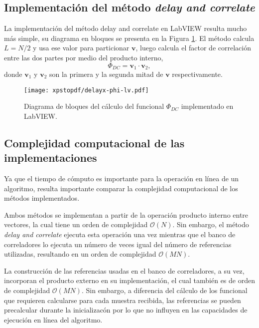 \subsection{Implementación del método \textit{delay and correlate}}

La implementación del método delay and correlate en LabVIEW resulta mucho más simple, su diagrama en bloques se presenta en la Figura \ref{fig:delayx_lv}. El método calcula $L = N/2$ y usa ese valor para particionar $\mathbf{v}$, luego calcula el factor de correlación entre las dos partes por medio del producto interno,
\begin{equation}\textstyle
    \Phi_{DC} = \mathbf{v}_1 \cdot \mathbf{v}_2,
\end{equation}
donde $\mathbf{v}_1$ y $\mathbf{v}_2$ son la primera y la segunda mitad de $\mathbf{v}$ respectivamente.

\begin{figure}[t]
    \centering{}\texttt{[image: xpstopdf/delayx-phi-lv.pdf]}
    \caption[Diagrama de bloques del cálculo de $\Phi_{DC}$ implementado en LabVIEW.]{Diagrama de bloques del cálculo del \color{RoyalBlue} funcional \color{black} $\Phi_{DC}$ implementado en LabVIEW.\label{fig:delayx_lv}}  
\end{figure}

\color{Green}
\subsection{Complejidad computacional de las implementaciones}
Ya que el tiempo de cómputo es importante para la operación en línea de un algoritmo, resulta importante comparar la complejidad computacional de los métodos implementados. 

Ambos métodos se implementan a partir de la operación producto interno entre vectores, la cual tiene un orden de complejidad $\mathcal{O}(N)$. Sin embargo, el método \textit{delay and correlate} ejecuta esta operación una vez mientras que el banco de correladores lo ejecuta un número de veces igual del número de referencias utilizadas, resultando en un orden de complejidad $\mathcal{O}(MN)$.

La construcción de las referencias usadas en el banco de correladores, a su vez, incorporan el producto externo en su implementación, el cual también es de orden de complejidad $\mathcal{O}(MN)$. Sin embargo, a diferencia del cálculo de los funcional que requieren calcularse para cada muestra recibida, las referencias se pueden precalcular durante la inicializacón por lo que no influyen en las capacidades de ejecución en línea del algoritmo. 


